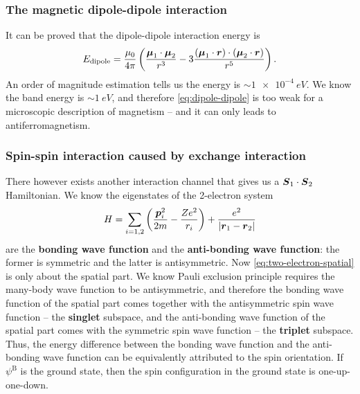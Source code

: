 \documentclass[hyperref, a4paper]{article}
\newcommand*{\concept}[1]{{\textbf{#1}}}
\begin{document}
\subsubsection{The magnetic dipole-dipole interaction}\label{sec:localized.heisenberg.dipole}

It can be proved that the dipole-dipole interaction energy is 
\begin{equation}
    E_{\text{dipole}} = 
    \frac{\mu_0}{4\pi}
    \left(
        \frac{\vb*{\mu}_1 \cdot \vb*{\mu}_2}{r^3}
        - 3 \frac{(\vb*{\mu}_1 \cdot \vb*{r}) \cdot (\vb*{\mu}_2 \cdot \vb*{r})}{r^5}
    \right).
    \label{eq:dipole-dipole}
\end{equation}
An order of magnitude estimation tells us the energy is $\sim \SI{1e-4}{eV}$.
We know the band energy is $\sim \SI{1}{eV}$,
and therefore \eqref{eq:dipole-dipole} is too weak
for a microscopic description of magnetism -- 
and it can only leads to antiferromagnetism.

\subsubsection{Spin-spin interaction caused by exchange interaction}

There however exists another interaction channel 
that gives us a $\vb*{S}_1 \cdot \vb*{S}_2$ Hamiltonian.
We know the eigenstates of the 2-electron system 
\begin{equation}
    H = \sum_{i = 1,2 } \left(
        \frac{\vb*{p}_i^2}{2m} - \frac{Z e^2}{r_i}
    \right)
    + \frac{e^2}{\abs{\vb*{r}_1 - \vb*{r}_2}}   
    \label{eq:two-electron-spatial}
\end{equation}
are the \concept{bonding wave function} and the \concept{anti-bonding wave function}:
the former is symmetric and the latter is antisymmetric.
Now \eqref{eq:two-electron-spatial} is only about the spatial part.
We know Pauli exclusion principle requires the many-body wave function 
to be antisymmetric,
and therefore the bonding wave function of the spatial part 
comes together with the antisymmetric spin wave function -- the \concept{singlet} subspace,
and the anti-bonding wave function of the spatial part 
comes with the symmetric spin wave function -- the \concept{triplet} subspace.
Thus, the energy difference between the bonding wave function and the anti-bonding wave function 
can be equivalently attributed to the spin orientation.
If $\psi^\text{B}$ is the ground state, 
then the spin configuration in the ground state is one-up-one-down.
\end{document}
